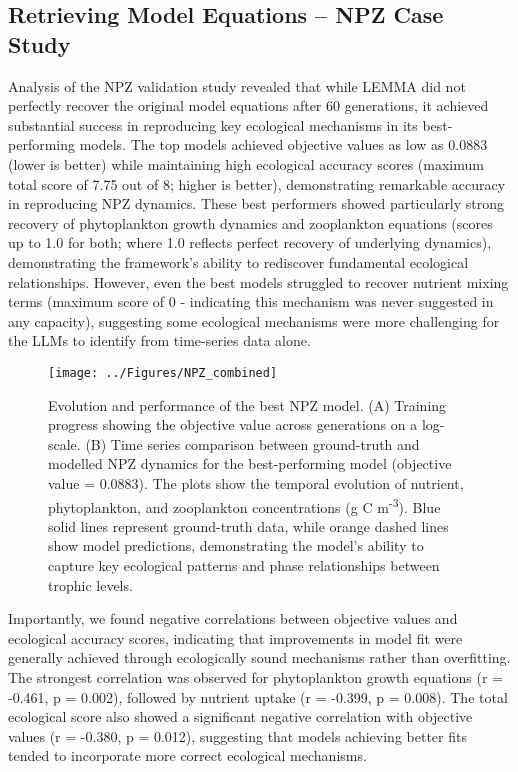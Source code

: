 \subsection{Retrieving Model Equations -- NPZ Case Study}

Analysis of the NPZ validation study revealed that while LEMMA did not perfectly recover the original model equations after 60 generations, it achieved substantial success in reproducing key ecological mechanisms in its best-performing models. The top models achieved objective values as low as 0.0883 (lower is better) while maintaining high ecological accuracy scores (maximum total score of 7.75 out of 8; higher is better), demonstrating remarkable accuracy in reproducing NPZ dynamics. These best performers showed particularly strong recovery of phytoplankton growth dynamics and zooplankton equations (scores up to 1.0 for both; where 1.0 reflects perfect recovery of underlying dynamics), demonstrating the framework's ability to rediscover fundamental ecological relationships. However, even the best models struggled to recover nutrient mixing terms (maximum score of 0 - indicating this mechanism was never suggested in any capacity), suggesting some ecological mechanisms were more challenging for the LLMs to identify from time-series data alone.

\begin{figure}[H]
\centering
\texttt{[image: ../Figures/NPZ\_combined]}
\caption{Evolution and performance of the best NPZ model. (A) Training progress showing the objective value across generations on a log-scale. (B) Time series comparison between ground-truth and modelled NPZ dynamics for the best-performing model (objective value = 0.0883). The plots show the temporal evolution of nutrient, phytoplankton, and zooplankton concentrations (g C m\textsuperscript{-3}). Blue solid lines represent ground-truth data, while orange dashed lines show model predictions, demonstrating the model's ability to capture key ecological patterns and phase relationships between trophic levels.}
\label{fig:npz_timeseries}
\end{figure}

Importantly, we found negative correlations between objective values and ecological accuracy scores, indicating that improvements in model fit were generally achieved through ecologically sound mechanisms rather than overfitting. The strongest correlation was observed for phytoplankton growth equations (r = -0.461, p = 0.002), followed by nutrient uptake (r = -0.399, p = 0.008). The total ecological score also showed a significant negative correlation with objective values (r = -0.380, p = 0.012), suggesting that models achieving better fits tended to incorporate more correct ecological mechanisms.

